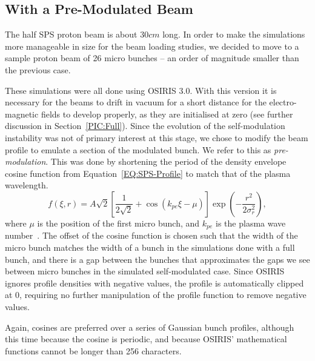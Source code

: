 

\subsection{With a Pre-Modulated Beam}
\label{Sim:PBPreMod}

The half SPS proton beam is about $30\unit{cm}$ long.
In order to make the simulations more manageable in size for the beam loading studies, we decided to move to a sample proton beam of 26 micro bunches -- an order of magnitude smaller than the previous case.

These simulations were all done using OSIRIS 3.0.
With this version it is necessary for the beams to drift in vacuum for a short distance for the electro-magnetic fields to develop properly, as they are initialised at zero (see further discussion in Section~\ref{PIC:Full}).
Since the evolution of the self-modulation instability was not of primary interest at this stage, we chose to modify the beam profile to emulate a section of the modulated bunch.
We refer to this as \textit{pre-modulation}.
This was done by shortening the period of the density envelope cosine function from Equation~\ref{EQ:SPS-Profile} to match that of the plasma wavelength.
\begin{equation}
    f(\xi,r) = A\sqrt{2} \left[\frac{1}{2\sqrt{2}}
             + \cos\left(k_{pe}\xi - \mu\right)\right] \exp\left(-\frac{r^{2}}{2\sigma_{r}^{2}}\right), \label{EQ:PB-PreMod}
\end{equation}
where $\mu$ is the position of the first micro bunch, and $k_{pe}$ is the plasma wave number~\cite{berglyd_olsen:2015}.
The offset of the cosine function is chosen such that the width of the micro bunch matches the width of a bunch in the simulations done with a full bunch, and there is a gap between the bunches that approximates the gaps we see between micro bunches in the simulated self-modulated case.
Since OSIRIS ignores profile densities with negative values, the profile is automatically clipped at $0$, requiring no further manipulation of the profile function to remove negative values.

Again, cosines are preferred over a series of Gaussian bunch profiles, although this time because the cosine is periodic, and because OSIRIS' mathematical functions cannot be longer than 256 characters.

